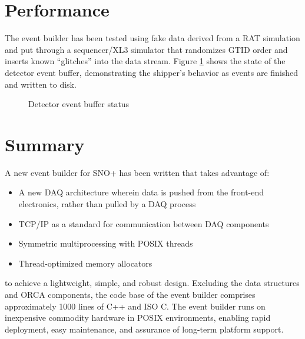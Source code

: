 \documentclass[11pt,twocolumn]{article}
\begin{document}
\section{Performance}
The event builder has been tested using fake data derived from a RAT simulation and put through a sequencer/XL3 simulator that randomizes GTID order and inserts known ``glitches'' into the data stream. Figure \ref{pointers_2k} shows the state of the detector event buffer, demonstrating the shipper's behavior as events are finished and written to disk.
\begin{figure}[htp]
\centering
\caption{Detector event buffer status}
\label{pointers_2k}
\end{figure}

\section{Summary}
A new event builder for SNO+ has been written that takes advantage of:
\begin{itemize}
\item A new DAQ architecture wherein data is pushed from the front-end electronics, rather than pulled by a DAQ process
\item TCP/IP as a standard for communication between DAQ components
\item Symmetric multiprocessing with POSIX threads
\item Thread-optimized memory allocators
\end{itemize}

to achieve a lightweight, simple, and robust design. Excluding the data structures and ORCA components, the code base of the event builder comprises approximately 1000 lines of C++ and ISO C. The event builder runs on inexpensive commodity hardware in POSIX environments, enabling rapid deployment, easy maintenance, and assurance of long-term platform support.
\end{document}
